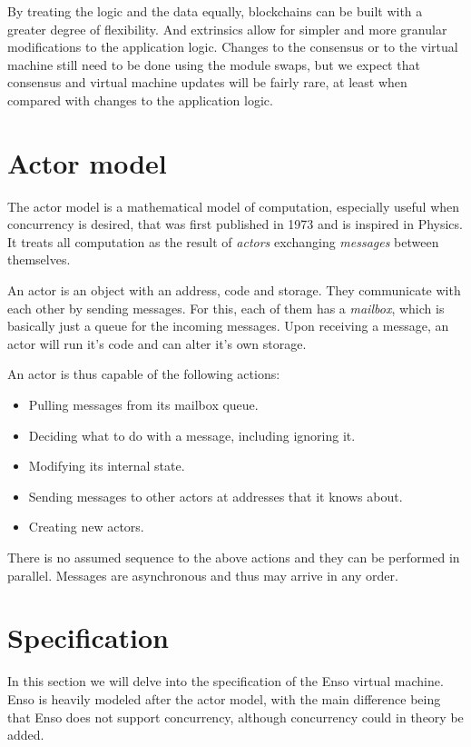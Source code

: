 \documentclass[conference]{IEEEtran}
\begin{document}
By treating the logic and the data equally, blockchains can be built with a greater degree of flexibility. And extrinsics allow for simpler and more granular modifications to the application logic. Changes to the consensus or to the virtual machine still need to be done using the module swaps, but we expect that consensus and virtual machine updates will be fairly rare, at least when compared with changes to the application logic.

\section{Actor model}
The actor model is a mathematical model of computation, especially useful when concurrency is desired, that was first published in 1973 and is inspired in Physics. It treats all computation as the result of \textit{actors} exchanging \textit{messages} between themselves.

An actor is an object with an address, code and storage. They communicate with each other by sending messages. For this, each of them has a \textit{mailbox}, which is basically just a queue for the incoming messages. Upon receiving a message, an actor will run it's code and can alter it's own storage.

An actor is thus capable of the following actions:
\begin{itemize}
	\item Pulling messages from its mailbox queue.
	\item Deciding what to do with a message, including ignoring it.
	\item Modifying its internal state.
	\item Sending messages to other actors at addresses that it knows about.
	\item Creating new actors.
\end{itemize}

There is no assumed sequence to the above actions and they can be performed in parallel. Messages are asynchronous and thus may arrive in any order.

\section{Specification}
In this section we will delve into the specification of the Enso virtual machine. Enso is heavily modeled after the actor model, with the main difference being that Enso does not support concurrency, although concurrency could in theory be added.
\end{document}
